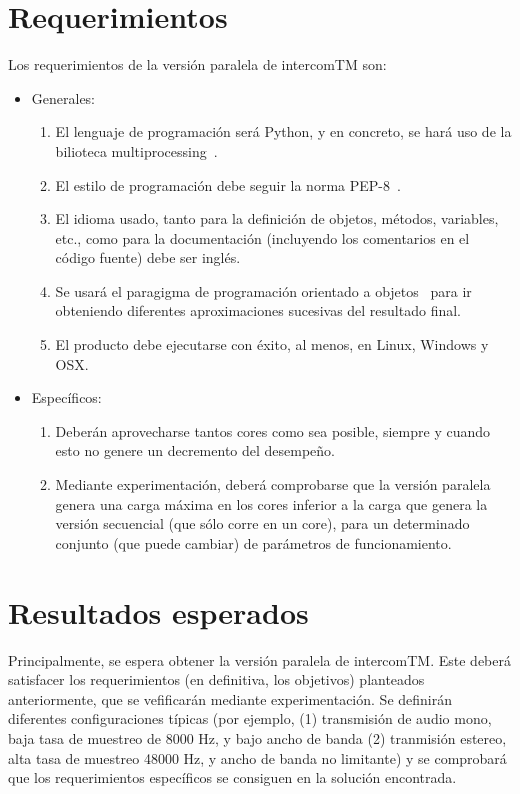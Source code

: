 \documentclass[titlepage, 12pt, a4paper, oneside]{article}
\begin{document}
\section{Requerimientos}
\label{sec:requerimientos}
Los requerimientos de la versión paralela de intercomTM son:

\begin{itemize}
\item Generales:
  \begin{enumerate}
  \item El lenguaje de programación será Python, y en concreto, se
    hará uso de la bilioteca multiprocessing~\cite{multiprocessing}.
  \item El estilo de programación debe seguir la norma
    PEP-8~\cite{PEP8}.
  \item El idioma usado, tanto para la definición de objetos, métodos,
    variables, etc., como para la documentación (incluyendo los
    comentarios en el código fuente) debe ser inglés.
  \item Se usará el paragigma de programación orientado a
    objetos~\cite{schach2008object} para ir obteniendo diferentes
    aproximaciones sucesivas del resultado final.
  \item El producto debe ejecutarse con éxito, al menos, en Linux,
    Windows y OSX.
  \end{enumerate}
\item Específicos:
  \begin{enumerate}
  \item Deberán aprovecharse tantos cores como sea posible, siempre y
    cuando esto no genere un decremento del desempeño.
  \item Mediante experimentación, deberá comprobarse que la versión
    paralela genera una carga máxima en los cores inferior a la carga
    que genera la versión secuencial (que sólo corre en un core), para
    un determinado conjunto (que puede cambiar) de parámetros de
    funcionamiento.
  \end{enumerate}
\end{itemize}

\section{Resultados esperados}
\label{sec:resultados}
Principalmente, se espera obtener la versión paralela de intercomTM.
Este deberá satisfacer los requerimientos (en definitiva, los
objetivos) planteados anteriormente, que se vefificarán mediante
experimentación.  Se definirán diferentes configuraciones típicas (por
ejemplo, (1) transmisión de audio mono, baja tasa de muestreo de 8000
Hz, y bajo ancho de banda (2) tranmisión estereo, alta tasa de
muestreo 48000 Hz, y ancho de banda no limitante) y se comprobará que
los requerimientos específicos se consiguen en la solución encontrada.
\end{document}
